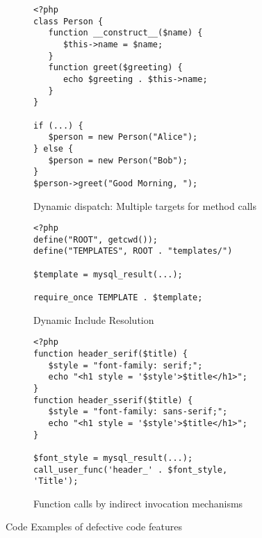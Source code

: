 \documentclass[sigconf]{acmart}
\begin{document}
\begin{figure}[t]
	\begin{subfigure}[b]{0.48\textwidth}
	
\begin{lstlisting}
<?php
class Person {
   function __construct__($name) {
      $this->name = $name;
   }
   function greet($greeting) {
      echo $greeting . $this->name;
   }
}

if (...) {
   $person = new Person("Alice");
} else {
   $person = new Person("Bob");
}
$person->greet("Good Morning, ");
\end{lstlisting}
	\caption{
		Dynamic dispatch: Multiple targets for method calls
		\label{fig:multi_target}
	}
	\end{subfigure}
	\vspace{2mm}
	\hfill
	\begin{subfigure}[b]{0.48\textwidth}

\begin{lstlisting}
<?php
define("ROOT", getcwd());
define("TEMPLATES", ROOT . "templates/")

$template = mysql_result(...);

require_once TEMPLATE . $template;
\end{lstlisting}
	\caption{
		Dynamic Include Resolution
		\label{fig:dynamic_includes}
	}
	\end{subfigure}
	\vspace{2mm}
	\hfill
	\begin{subfigure}[b]{0.48\textwidth}

\begin{lstlisting}
<?php
function header_serif($title) {
   $style = "font-family: serif;";
   echo "<h1 style = '$style'>$title</h1>";
}
function header_sserif($title) {
   $style = "font-family: sans-serif;";
   echo "<h1 style = '$style'>$title</h1>";
}

$font_style = mysql_result(...);
call_user_func('header_' . $font_style, 'Title');
\end{lstlisting}
	\caption{
		Function calls by indirect invocation mechanisms
		\label{fig:indirect_calls}
	}
	
	\end{subfigure}
	\caption{
		Code Examples of defective code features
		\label{fig:defective_code_features}
	}
\end{figure}
\end{document}
